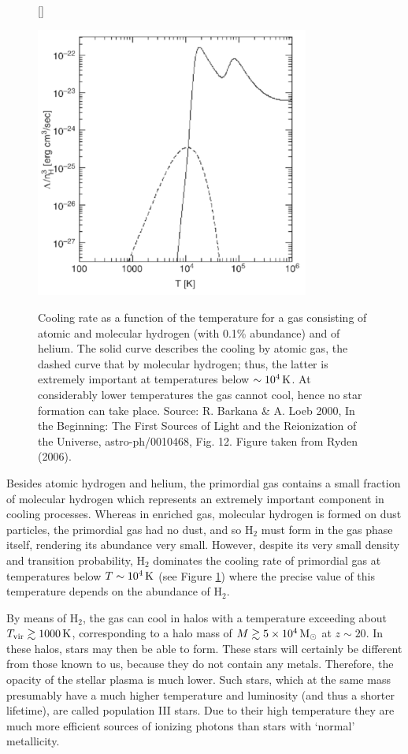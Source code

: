 \documentclass[a4paper,11pt]{article}
\begin{document}
\begin{figure}[t]
    [\FBwidth]
    {\caption{\footnotesize{Cooling rate as a function of the temperature for a gas consisting of atomic and molecular hydrogen (with 0.1\% abundance) and of helium. The solid curve describes the cooling by atomic gas, the dashed curve that by molecular hydrogen; thus, the latter is extremely important at temperatures below $\sim10^4\,{\rm K}$. At considerably lower temperatures the gas cannot cool, hence no star formation can take place. Source: R. Barkana \& A. Loeb 2000, In the Beginning: The First Sources of Light and the Reionization of the Universe, astro-ph/0010468, Fig. 12. Figure taken from Ryden (2006).}}
    \label{fig:coolingfunctionhydrogen}}
    {\includegraphics[width=9cm]{figures/CoolingFunctionHydrogen.png}}
\end{figure}

{\noindent}Besides atomic hydrogen and helium, the primordial gas contains a small fraction of molecular hydrogen which represents an extremely important component in cooling processes. Whereas in enriched gas, molecular hydrogen is formed on dust particles, the primordial gas had no dust, and so H$_2$ must form in the gas phase itself, rendering its abundance very small. However, despite its very small density and transition probability, H$_2$ dominates the cooling rate of primordial gas at temperatures below $T\sim10^4\,{\rm K}$ (see Figure \ref{fig:coolingfunctionhydrogen}) where the precise value of this temperature depends on the abundance of H$_2$.

{\noindent}By means of H$_2$, the gas can cool in halos with a temperature exceeding about $T_\mathrm{vir}\gtrsim1000\,{\rm K}$, corresponding to a halo mass of $M\gtrsim5\times10^4\,{\rm M_\odot}$ at $z\sim20$. In these halos, stars may then be able to form. These stars will certainly be different from those known to us, because they do not contain any metals. Therefore, the opacity of the stellar plasma is much lower. Such stars, which at the same mass presumably have a much higher temperature and luminosity (and thus a shorter lifetime), are called population III stars. Due to their high temperature they are much more efficient sources of ionizing photons than stars with `normal' metallicity.
\end{document}
